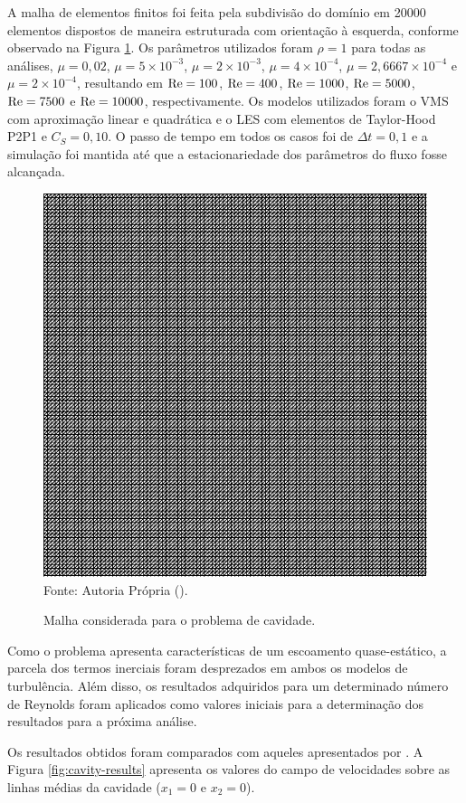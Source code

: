 A malha de elementos finitos foi feita pela subdivisão do domínio em 20000 elementos dispostos de maneira estruturada com orientação à esquerda, conforme observado na Figura \ref{fig:cavity_disc}. Os parâmetros utilizados foram $\rho=1$ para todas as análises, $\mu=0,02$, $\mu=5\times10^{-3}$, $\mu=2\times10^{-3}$, $\mu=4\times10^{-4}$, $\mu=2,6667\times10^{-4}$ e $\mu=2\times10^{-4}$, resultando em $\mathrm{Re}=100$, $\mathrm{Re}=400$, $\mathrm{Re}=1000$, $\mathrm{Re}=5000$, $\mathrm{Re}=7500$ e $\mathrm{Re}=10000$, respectivamente. Os modelos utilizados foram o VMS com aproximação linear e quadrática e o LES com elementos de Taylor-Hood P2P1 e $C_S=0,10$. O passo de tempo em todos os casos foi de $\Delta t=0,1$ e a simulação foi mantida até que a estacionariedade dos parâmetros do fluxo fosse alcançada.

\begin{figure}[h]
    \centering
    \caption{Malha considerada para o problema de cavidade.}
    \includegraphics[width=.6\linewidth]{Figuras/Cavity/mesh.pdf}
    \\Fonte: Autoria Própria (\the\year).
    \label{fig:cavity_disc}
\end{figure}

Como o problema apresenta características de um escoamento quase-estático, a parcela dos termos inerciais foram desprezados em ambos os modelos de turbulência. Além disso, os resultados adquiridos para um determinado número de Reynolds foram aplicados como valores iniciais para a determinação dos resultados para a próxima análise.

Os resultados obtidos foram comparados com aqueles apresentados por . A Figura \ref{fig:cavity-results} apresenta os valores do campo de velocidades sobre as linhas médias da cavidade ($x_1=0$ e $x_2=0$).


